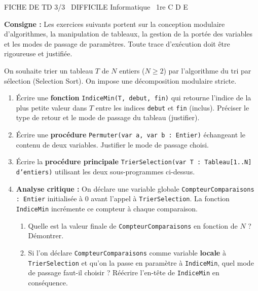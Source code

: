 \documentclass[11pt]{article}
\begin{document}
\begin{tcolorbox}[enhanced,colback=popink,colframe=popink,arc=10pt,boxrule=0pt,left=12pt,right=12pt,top=9pt,bottom=9pt]
{\color{white}\popxbold\small FICHE DE TD 3/3 \textbullet\ DIFFICILE \hfill Informatique \textbullet\ 1re C D E\par}
\end{tcolorbox}
\vspace{4pt}
\noindent \textbf{Consigne :} Les exercices suivants portent sur la conception modulaire d'algorithmes, la manipulation de tableaux, la gestion de la portée des variables et les modes de passage de paramètres. Toute trace d'exécution doit être rigoureuse et justifiée.

\begin{exercice}
On souhaite trier un tableau $T$ de $N$ entiers ($N \ge 2$) par l'algorithme du tri par sélection (Selection Sort). On impose une décomposition modulaire stricte.
\begin{enumerate}
    \item Écrire une \textbf{fonction} \texttt{IndiceMin(T, debut, fin)} qui retourne l'indice de la plus petite valeur dans $T$ entre les indices \texttt{debut} et \texttt{fin} (inclus). Préciser le type de retour et le mode de passage du tableau (justifier).
    \item Écrire une \textbf{procédure} \texttt{Permuter(var a, var b : Entier)} échangeant le contenu de deux variables. Justifier le mode de passage choisi.
    \item Écrire la \textbf{procédure principale} \texttt{TrierSelection(var T : Tableau[1..N] d'entiers)} utilisant les deux sous-programmes ci-dessus.
    \item \textbf{Analyse critique :} On déclare une variable globale \texttt{CompteurComparaisons : Entier} initialisée à 0 avant l'appel à \texttt{TrierSelection}. La fonction \texttt{IndiceMin} incrémente ce compteur à chaque comparaison.
    \begin{enumerate}
        \item Quelle est la valeur finale de \texttt{CompteurComparaisons} en fonction de $N$ ? Démontrer.
        \item Si l'on déclare \texttt{CompteurComparaisons} comme variable \textbf{locale} à \texttt{TrierSelection} et qu'on la passe en paramètre à \texttt{IndiceMin}, quel mode de passage faut-il choisir ? Réécrire l'en-tête de \texttt{IndiceMin} en conséquence.
    \end{enumerate}
\end{enumerate}
\end{exercice}
\end{document}
